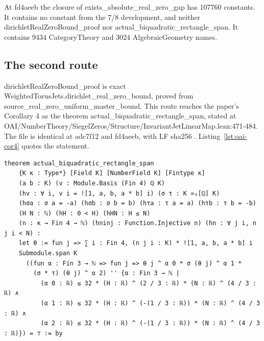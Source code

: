 At fd4aeeb the closure of exists\_absolute\_real\_zero\_gap has 107760 constants.
It contains no constant from the 7/8 development, and neither dirichletRealZeroBound\_proof nor actual\_biquadratic\_rectangle\_span.
It contains 9434 CategoryTheory and 3024 AlgebraicGeometry names.

\subsection{The second route}

dirichletRealZeroBound\_proof is exact WeightedTorusJets.dirichlet\_real\_zero\_bound, proved from source\_real\_zero\_uniform\_master\_bound.
This route reaches the paper's Corollary 4 as the theorem actual\_biquadratic\_rectangle\_span, stated at OAI/NumberTheory/SiegelZeros/Structure/InvariantJetLinearMap.lean:471-484.
The file is identical at adc7f12 and fd4aeeb, with LF sha256 .
Listing~\ref{lst:oai-cor4} quotes the statement.

\begin{listing}[tbp]
\caption{OAI's Corollary 4, OAI/\allowbreak NumberTheory/\allowbreak SiegelZeros/\allowbreak Structure/\allowbreak InvariantJetLinearMap.lean:471-484 (LF sha256 09b8bd7f\ldots, identical at adc7f12 and fd4aeeb).}\label{lst:oai-cor4}
\begin{Verbatim}
theorem actual_biquadratic_rectangle_span
    {K κ : Type*} [Field K] [NumberField K] [Fintype κ]
    (a b : K) (v : Module.Basis (Fin 4) ℚ K)
    (hv : ∀ i, v i = ![1, a, b, a * b] i) (σ τ : K ≃ₐ[ℚ] K)
    (hσa : σ a = -a) (hσb : σ b = b) (hτa : τ a = a) (hτb : τ b = -b)
    (H N : ℕ) (hH : 0 < H) (hHN : H ≤ N)
    (n : κ → Fin 4 → ℕ) (hninj : Function.Injective n) (hn : ∀ j i, n j i < N) :
    let θ := fun j => ∑ i : Fin 4, (n j i : K) * ![1, a, b, a * b] i
    Submodule.span K
      ((fun α : Fin 3 → ℕ => fun j => θ j ^ α 0 * σ (θ j) ^ α 1 *
        (σ * τ) (θ j) ^ α 2) '' {α : Fin 3 → ℕ |
          (α 0 : ℝ) ≤ 32 * (H : ℝ) ^ (2 / 3 : ℝ) * (N : ℝ) ^ (4 / 3 : ℝ) ∧
          (α 1 : ℝ) ≤ 32 * (H : ℝ) ^ (-(1 / 3 : ℝ)) * (N : ℝ) ^ (4 / 3 : ℝ) ∧
          (α 2 : ℝ) ≤ 32 * (H : ℝ) ^ (-(1 / 3 : ℝ)) * (N : ℝ) ^ (4 / 3 : ℝ)}) = ⊤ := by
\end{Verbatim}
\end{listing}

